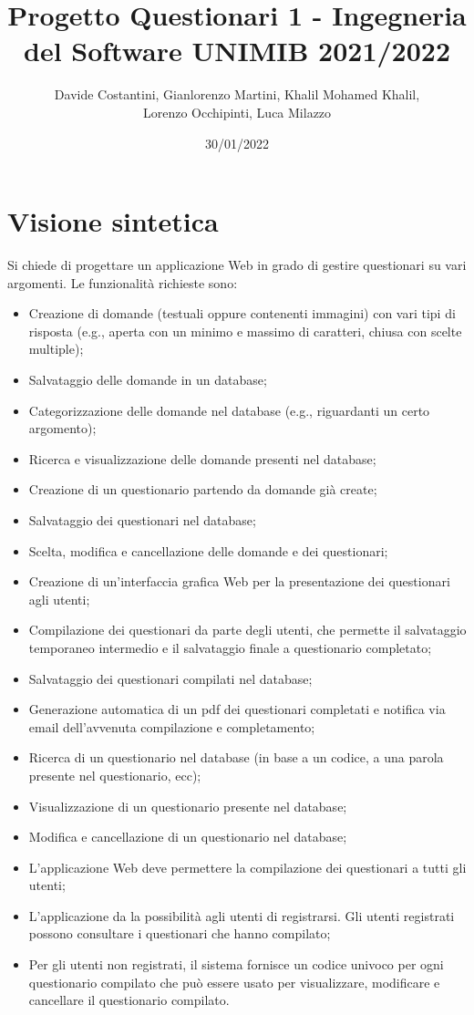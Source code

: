 \documentclass[12pt]{article}
\title{ Progetto Questionari 1 - Ingegneria del Software  UNIMIB 2021/2022} %
\author{Davide Costantini, Gianlorenzo Martini, Khalil Mohamed Khalil, \\ Lorenzo Occhipinti, Luca Milazzo} %
\date{30/01/2022} %
\begin{document}
\maketitle %
\newpage
\tableofcontents \newpage
\section{Visione sintetica}

Si chiede di progettare un applicazione Web in grado di gestire questionari su vari argomenti.
Le funzionalit\`{a} richieste sono:
\begin{itemize}
\item Creazione di domande (testuali oppure contenenti immagini) con vari tipi di risposta (e.g., aperta con un minimo e massimo di caratteri, chiusa con scelte multiple);
\item Salvataggio delle domande in un database;
\item Categorizzazione delle domande nel database (e.g., riguardanti un certo argomento);
\item Ricerca e visualizzazione delle domande presenti nel database;
\item Creazione di un questionario partendo da domande gi\`{a} create;
\item Salvataggio dei questionari nel database;
\item Scelta, modifica e cancellazione delle domande e dei questionari;
\item Creazione di un'interfaccia grafica Web per la presentazione dei questionari agli utenti;
\item Compilazione dei questionari da parte degli utenti, che permette il salvataggio temporaneo intermedio e il salvataggio finale a questionario completato;
\item Salvataggio dei questionari compilati nel database;
\item Generazione automatica di un pdf dei questionari completati e notifica via email dell'avvenuta
compilazione e completamento;
\item Ricerca di un questionario nel database (in base a un codice, a una parola presente nel questionario, ecc);
\item Visualizzazione di un questionario presente nel database;
\item Modifica e cancellazione di un questionario nel database;
\item L'applicazione Web deve permettere la compilazione dei questionari a tutti gli utenti;
\item L'applicazione da la possibilit\`{a} agli utenti di registrarsi. Gli utenti registrati possono consultare i questionari che hanno compilato;
\item Per gli utenti non registrati, il sistema fornisce un codice univoco per ogni questionario compilato che pu\`{o} essere usato per visualizzare, modificare e cancellare il questionario compilato.
\end{itemize}
\end{document}
